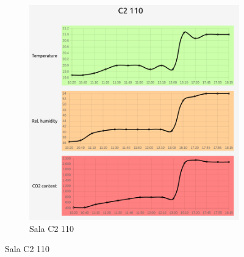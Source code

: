 \begin{figure}[H]
\begin{subfigure}{0.5\textwidth}
        \includegraphics[width=\linewidth]{zdj/app/readings-c2110.png}
        \caption{Sala C2 110}
    \end{subfigure}
\end{figure}
